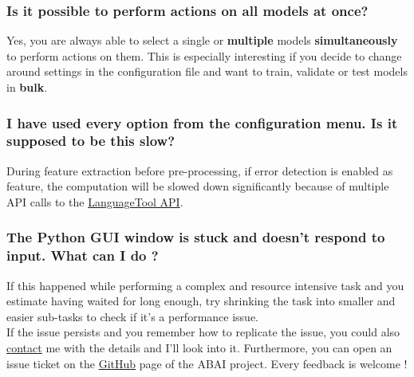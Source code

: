 \subsubsection{Is it possible to perform actions on all models at once?}
Yes, you are always able to select a single or \textbf{multiple} models \textbf{simultaneously} to perform actions on them. This is especially interesting if you decide to change around settings in the configuration file and want to train, validate or test models in \textbf{bulk}. 

\subsubsection{I have used every option from the configuration menu. Is it supposed to be this slow?}
During feature extraction before pre-processing, if error detection is enabled as feature, the computation will be slowed down significantly because of multiple API calls to the \href{https://languagetool.org/http-api/}{LanguageTool API}.

\subsubsection{The Python GUI window is stuck and doesn't respond to input. What can I do ?}
If this happened while performing a complex and resource intensive task and you estimate having waited for long enough, try shrinking the task into smaller and easier sub-tasks to check if it's a performance issue. \\
\newline If the issue persists and you remember how to replicate the issue, you could also \hyperref[sec:contact]{contact} me with the details and I'll look into it. Furthermore, you can open an issue ticket on the \href{https://github.com/UNamurCSFaculty/2324_INFOB318_ABAI2/issues}{GitHub} page of the ABAI project. Every feedback is welcome ! 
